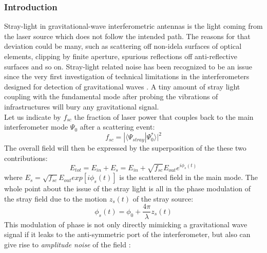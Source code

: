 \subsubsection*{Introduction}

Stray-light in gravitational-wave interferometric antennas is the light coming from the laser source which does not follow the intended path. The reasons for that deviation could be many, such as scattering off non-idela surfaces of optical elements, clipping by finite aperture, spurious reflections off anti-reflective surfaces and so on. Stray-light related noise has been recognized to be an issue since the very first investigation of technical limitations in the interferometers designed for detection of gravitational waves \cite{Billing79}. A tiny amount of stray light coupling with the fundamental mode after probing the vibrations of infrastructures will bury any gravitational signal. \\
Let us indicate by $f_{sc}$ the fraction of laser power that couples back to the main interferometer mode $\Psi_0$ after a scattering event:
  \begin{equation}
    f_{sc} = |\langle \Psi_{stray}|\Psi_0^*\rangle |^2
  \end{equation}
 The overall field will then be expressed by the superposition of the these two contributions: 
   \begin{equation}
        E_{tot} = E_{in} + E_{s} = E_{in} + \sqrt{f_{sc}} E_{out} e^{i \phi_s(t)}
   \end{equation}  
where $E_{s} = \sqrt{f_{sc}} E_{out} exp \left[i \phi_s(t) \right]$ is the scattered field in the main mode.
The whole point about the issue of the stray light is all in the phase modulation of the stray field due to the motion $ z_s(t)$ of the stray source:
   \begin{equation}
        \phi_s(t) = \phi_0 + \frac{4\pi}{\lambda} z_s(t)
   \end{equation}
  This modulation of phase is not only directly mimicking a gravitational wave signal if it leaks to the anti-symmetric port of the interferometer, but also can give rise to \textit{amplitude noise} of the field \cite{vajente_vesf12}:

